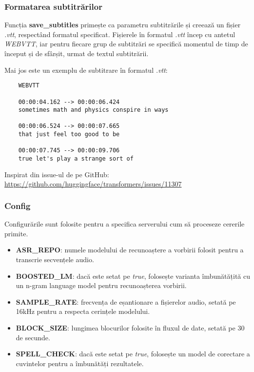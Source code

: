 \subsubsection{Formatarea subtitrărilor}
Funcția \textbf{save\_subtitles} primește ca parametru subtitrările și creează un fișier \textit{.vtt},
respectând formatul specificat. Fișierele în formatul \textit{.vtt} încep cu antetul \textit{WEBVTT},
iar pentru fiecare grup de subtitrări se specifică momentul de timp de început și de sfârșit, urmat
de textul subtitrării.
\par
Mai jos este un exemplu de subtitrare în formatul \textit{.vtt}:

\begin{verbatim}
    WEBVTT

    00:00:04.162 --> 00:00:06.424
    sometimes math and physics conspire in ways

    00:00:06.524 --> 00:00:07.665
    that just feel too good to be

    00:00:07.745 --> 00:00:09.706
    true let's play a strange sort of
\end{verbatim}


\par
Inspirat din issue-ul de pe GitHub: \url{https://github.com/huggingface/transformers/issues/11307}

\subsubsection{Config}
Configurările sunt folosite pentru a specifica serverului cum să proceseze cererile primite.
\begin{itemize}
    \item \textbf{ASR\_REPO}: numele modelului de recunoaștere a vorbirii folosit pentru a transcrie
    secvențele audio.
    \item \textbf{BOOSTED\_LM}: dacă este setat pe \textit{true}, folosește varianta îmbunătățită cu
    un n-gram language model pentru recunoașterea vorbirii.
    \item \textbf{SAMPLE\_RATE}: frecvența de eșantionare a fișierelor audio, setată pe 16kHz pentru
    a respecta cerințele modelului.
    \item \textbf{BLOCK\_SIZE}: lungimea blocurilor folosite în fluxul de date, setată pe 30 de secunde.
    \item \textbf{SPELL\_CHECK}: dacă este setat pe \textit{true}, folosește un model de corectare a
    cuvintelor pentru a îmbunătăți rezultatele.
\end{itemize}

